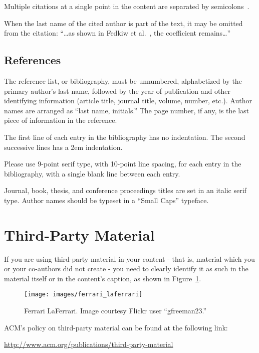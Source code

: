 \documentclass[tog]{acmsiggraph}
\begin{document}
Multiple citations at a single point in the content are separated by
semicolons~\cite{levoy:2000:TDM,sako:2001:SSB}.

When the last name of the cited author is part of the text, it may be
omitted from the citation: ``\ldots as shown in Fedkiw et
al.~, the coefficient remains\ldots''

\subsection{References}

The reference list, or bibliography, must be unnumbered, alphabetized
by the primary author's last name, followed by the year of publication
and other identifying information (article title, journal title,
volume, number, etc.). Author names are arranged as ``last name,
initials.'' The page number, if any, is the last piece of information
in the reference.

The first line of each entry in the bibliography has no
indentation. The second successive lines has a 2em
indentation. 

Please use 9-point serif type, with 10-point line spacing, for each
entry in the bibliography, with a single blank line between each
entry. 

Journal, book, thesis, and conference proceedings titles are set in an
italic serif type. {\sc Author names should be typeset in a ``Small
Caps'' typeface.}

\section{Third-Party Material}

If you are using third-party material in your content - that is,
material which you or your co-authors did not create - you need to
clearly identify it as such in the material itself or in the 
content's caption, as shown in Figure~\ref{fig:ferrari}.

\begin{figure}[ht]
  \centering
  \texttt{[image: images/ferrari\_laferrari]}
  \caption{Ferrari LaFerrari. Image courtesy Flickr user ``gfreeman23.''}
  \label{fig:ferrari}
\end{figure}

ACM's policy on third-party material can be found at the following link:

{\small\url{http://www.acm.org/publications/third-party-material}}
\end{document}
